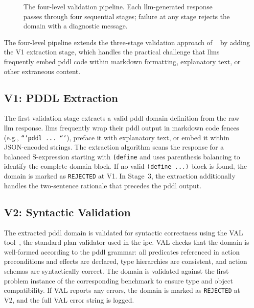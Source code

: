 \begin{figure}[htbp]
{%
  }
  \caption{The four-level validation pipeline. Each \gls{llm}-generated response passes through four sequential stages; failure at any stage rejects the domain with a diagnostic message.}
  \label{fig:validation_pipeline}
\end{figure}

The four-level pipeline extends the three-stage validation approach of \citeauthor{Georgievski2025}~\cite{Georgievski2025} by adding the V1 extraction stage, which handles the practical challenge that \glspl{llm} frequently embed \gls{pddl} code within markdown formatting, explanatory text, or other extraneous content.

\subsection{V1: PDDL Extraction}
\label{sec:design:v1_extraction}

The first validation stage extracts a valid \gls{pddl} domain definition from the raw \gls{llm} response.
\glspl{llm} frequently wrap their \gls{pddl} output in markdown code fences (e.g., \texttt{```pddl ... ```}), preface it with explanatory text, or embed it within JSON-encoded strings.
The extraction algorithm scans the response for a balanced S-expression starting with \texttt{(define} and uses parenthesis balancing to identify the complete domain block.
If no valid \texttt{(define ...)} block is found, the domain is marked as \texttt{REJECTED} at V1.
In Stage~3, the extraction additionally handles the two-sentence rationale that precedes the \gls{pddl} output.

\subsection{V2: Syntactic Validation}
\label{sec:design:v2_val}

The extracted \gls{pddl} domain is validated for syntactic correctness using the VAL tool~\cite{HoweyLongFox2004}, the standard plan validator used in the \gls{ipc}.
VAL checks that the domain is well-formed according to the \gls{pddl} grammar: all predicates referenced in action preconditions and effects are declared, type hierarchies are consistent, and action schemas are syntactically correct.
The domain is validated against the first problem instance of the corresponding benchmark to ensure type and object compatibility.
If VAL reports any errors, the domain is marked as \texttt{REJECTED} at V2, and the full VAL error string is logged.

